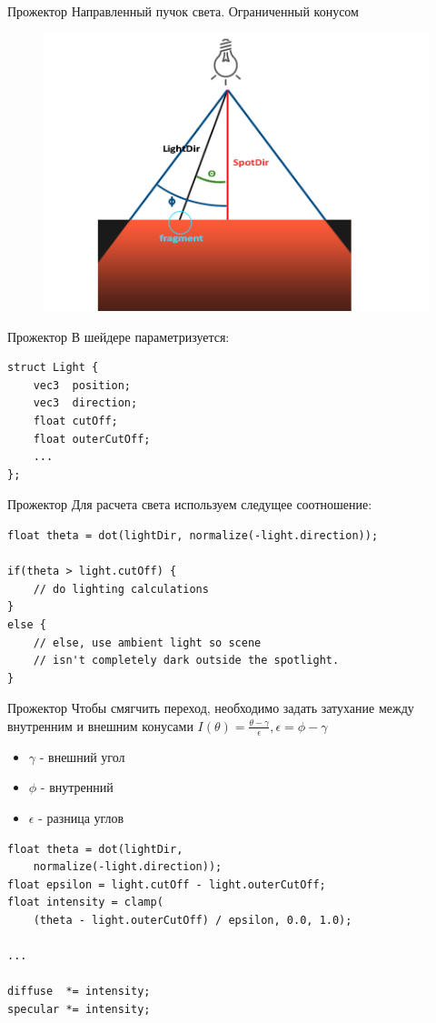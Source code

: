 \documentclass[aspectration=1610,t]{beamer}
\begin{document}
\begin{frame}[fragile]{Прожектор}
    Направленный пучок света. Ограниченный конусом
    \begin{figure}[htp]
        \centering
        \includegraphics[scale=0.4]{res/spot}
    \end{figure}
\end{frame}

\begin{frame}[fragile]{Прожектор}
    В шейдере параметризуется:
    {\small \begin{lstlisting}
struct Light {
    vec3  position;
    vec3  direction;
    float cutOff;
    float outerCutOff;
    ...
};    
    \end{lstlisting}}
\end{frame}

\begin{frame}[fragile]{Прожектор}
    Для расчета света используем следущее соотношение:
    {\small \begin{lstlisting}
float theta = dot(lightDir, normalize(-light.direction));

if(theta > light.cutOff) { 
    // do lighting calculations
}
else {
    // else, use ambient light so scene 
    // isn't completely dark outside the spotlight.
}
    \end{lstlisting}}
\end{frame}

\begin{frame}[fragile]{Прожектор}
    Чтобы смягчить переход, необходимо задать затухание между внутренним и внешним конусами
    $I(\theta) = \frac{\theta - \gamma}{\epsilon}, \epsilon = \phi - \gamma$
    \begin{itemize}
        \item $\gamma$ - внешний угол
        \item $\phi$ - внутренний
        \item $\epsilon$ - разница углов
    \end{itemize}
    {\small \begin{lstlisting}
float theta = dot(lightDir,
    normalize(-light.direction));
float epsilon = light.cutOff - light.outerCutOff;
float intensity = clamp(
    (theta - light.outerCutOff) / epsilon, 0.0, 1.0);

...

diffuse  *= intensity;
specular *= intensity;
    \end{lstlisting}}
\end{frame}
\end{document}
